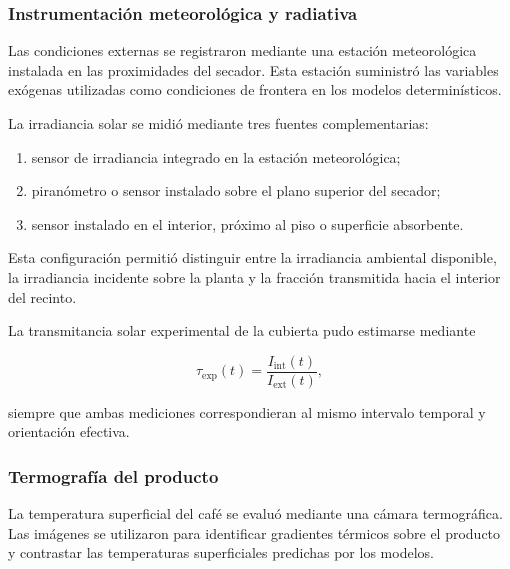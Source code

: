 \subsubsection{Instrumentación meteorológica y radiativa}
\label{subsubsec:instrumentacion_meteorologica_radiativa}

Las condiciones externas se registraron mediante una estación meteorológica instalada en las proximidades del secador. Esta estación suministró las variables exógenas utilizadas como condiciones de frontera en los modelos determinísticos.

La irradiancia solar se midió mediante tres fuentes complementarias:

\begin{enumerate}
    \item sensor de irradiancia integrado en la estación meteorológica;
    \item piranómetro o sensor instalado sobre el plano superior del secador;
    \item sensor instalado en el interior, próximo al piso o superficie absorbente.
\end{enumerate}

Esta configuración permitió distinguir entre la irradiancia ambiental disponible, la irradiancia incidente sobre la planta y la fracción transmitida hacia el interior del recinto.

La transmitancia solar experimental de la cubierta pudo estimarse mediante

\begin{equation}
\tau_{\mathrm{exp}}(t)
=
\frac{I_{\mathrm{int}}(t)}
{I_{\mathrm{ext}}(t)},
\label{eq:transmitancia_experimental}
\end{equation}

siempre que ambas mediciones correspondieran al mismo intervalo temporal y orientación efectiva.

\subsubsection{Termografía del producto}
\label{subsubsec:termografia_producto}

La temperatura superficial del café se evaluó mediante una cámara termográfica. Las imágenes se utilizaron para identificar gradientes térmicos sobre el producto y contrastar las temperaturas superficiales predichas por los modelos.

